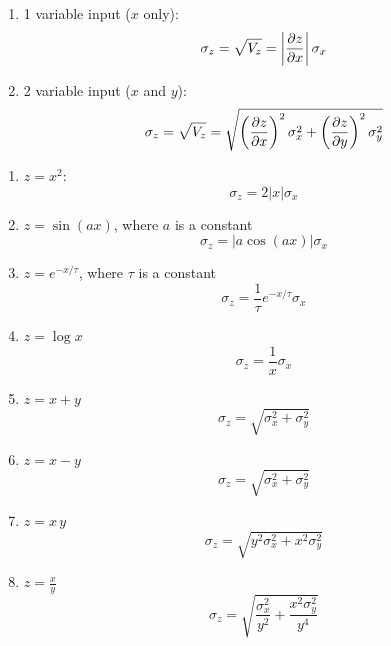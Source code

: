 \documentclass[10pt]{article}
\begin{document}
\begin{enumerate}
	\item 1 variable input ($x$ only):
	      \[ \sigma_z = \sqrt{V_z} = \left|\pdv{z}{x}\right| \sigma_x \]

	\item 2 variable input ($x$ and $y$):
	      \[ \sigma_z = \sqrt{V_z} = \sqrt{\left(\pdv{z}{x}\right)^2 \sigma_x^2 + \left(\pdv{z}{y}\right)^2 \sigma_y^2} \]
\end{enumerate}


\begin{enumerate}[label=(\alph*)]
	\item $z=x^2$:
	      \[ \boxed{\sigma_z = 2|x| \sigma_x} \]

	\item $z=\sin(a x)$, where $a$ is a constant
	      \[ \boxed{\sigma_z = |a \cos(a x)| \sigma_x} \]

	\item $z=e^{-x/\tau}$, where $\tau$ is a constant
	      \[ \boxed{\sigma_z = \frac{1}{\tau} e^{-x/\tau} \sigma_x} \]

	\item $z=\log x$
	      \[ \boxed{\sigma_z = \frac{1}{x} \sigma_x} \]

	\item $z=x+y$
	      \[ \boxed{\sigma_z = \sqrt{\sigma_x^2 + \sigma_y^2}} \]

	\item $z=x-y$
	      \[ \boxed{\sigma_z = \sqrt{\sigma_x^2 + \sigma_y^2}} \]

	\item $z=x\,y$
	      \[ \boxed{\sigma_z = \sqrt{y^2 \sigma_x^2 + x^2 \sigma_y^2}} \]

	\item $z=\frac{x}{y}$
	      \[ \boxed{\sigma_z = \sqrt{\frac{\sigma_x^2}{y^2} + \frac{x^2 \sigma_y^2}{y^4}}} \]

\end{enumerate}
\end{document}
